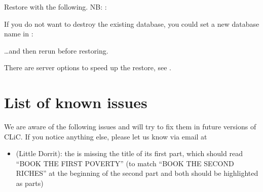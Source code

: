 \documentclass[letterpaper,10pt,english]{sphinxmanual}
\begin{document}
\begin{sphinxVerbatim}[commandchars=\\\{\}]
 
\end{sphinxVerbatim}

\sphinxAtStartPar
Restore with the following. NB: :

\begin{sphinxVerbatim}[commandchars=\\\{\}]
 
\end{sphinxVerbatim}

\sphinxAtStartPar
If you do not want to destroy the existing database, you could set a new database name in :

\begin{sphinxVerbatim}[commandchars=\\\{\}]
   
\end{sphinxVerbatim}

\sphinxAtStartPar
…and then re\sphinxhyphen{}run  before restoring.

\sphinxAtStartPar
There are server options to speed up the restore, see .

\sphinxstepscope


\chapter{List of known issues}
\label{\detokenize{known-issues:list-of-known-issues}}\label{\detokenize{known-issues::doc}}
\sphinxAtStartPar
We are aware of the following issues and will try to fix them in future versions of CLiC.
If you notice anything else, please let us know via email at 
\begin{itemize}
\item {} 
\sphinxAtStartPar
{} (Little Dorrit): the  is missing the title of its first part, which should read “BOOK THE FIRST POVERTY” (to match “BOOK THE SECOND RICHES” at the beginning of the second part \sphinxhyphen{} and both should be highlighted as parts)

\end{itemize}
\end{document}
